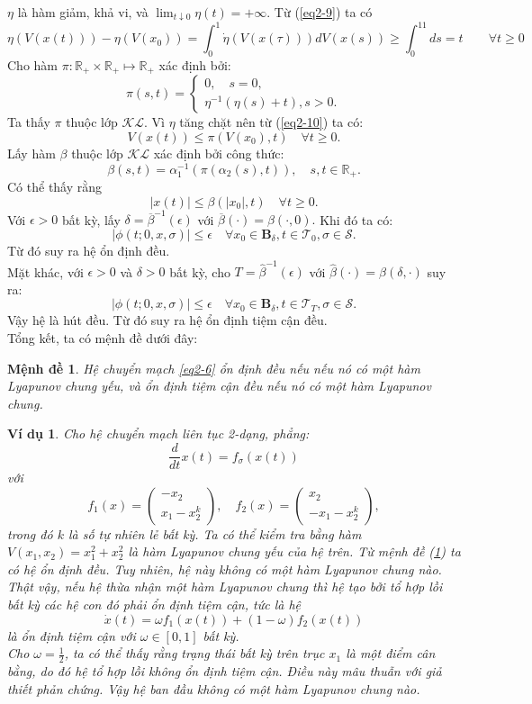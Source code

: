 \documentclass[14pt,a4paper,oneside]{report}		%
\newtheorem{proposition}[theorem]{Mệnh đề}
\newtheorem{example}[theorem]{Ví dụ}
\begin{document}
$\eta$ là hàm giảm, khả vi, và $\lim_{t\downarrow 0}\eta(t)=+\infty$. Từ (\ref{eq2-9}) ta có
\begin{equation} \label{eq2-10}
\eta (V(x(t))) - \eta (V(x_0)) = \int_0^1\dot{\eta}(V(x(\tau)))dV(x(s)) \geq \int_0^11ds=t\qquad\forall t\geq 0
\end{equation}
Cho hàm $\pi:\mathbb{R}_+\times\mathbb{R}_+\mapsto\mathbb{R}_+$ xác định bởi:
$$\pi(s,t)=
\begin{cases}
0, \quad s=0,\\
\eta^{-1}(\eta(s)+t), s>0.
\end{cases}$$
Ta thấy $\pi$ thuộc lớp $\mathcal{KL}$. Vì $\eta$ tăng chặt nên từ (\ref{eq2-10}) ta có:
$$V(x(t))\leq\pi(V(x_0),t)\quad\forall t\geq 0.$$
Lấy hàm $\beta$ thuộc lớp $\mathcal{KL}$ xác định bởi công thức:
$$\beta(s,t)=\alpha_1^{-1}(\pi(\alpha_2(s),t)), \quad s,t\in\mathbb{R}_+.$$
Có thể thấy rằng 
$$|x(t)|\leq\beta(|x_0|,t)\quad\forall t\geq 0.$$
Với $\epsilon>0$ bất kỳ, lấy $\delta=\overline{\beta}^{-1}(\epsilon)$ với $\overline{\beta}(\cdot)=\beta(\cdot,0).$ Khi đó ta có:
$$|\phi(t;0,x,\sigma)|\leq\epsilon\quad\forall x_0\in\mathbf{B}_\delta,t\in\mathcal{T}_0,\sigma\in\mathcal{S}.$$
Từ đó suy ra hệ ổn định đều.\\
Mặt khác, với $\epsilon >0$ và $\delta >0$ bất kỳ, cho $T=\widehat{\beta}^{-1}(\epsilon)$ với $\widehat{\beta}(\cdot)=\beta(\delta,\cdot)$ suy ra:
$$|\phi(t;0,x,\sigma)|\leq\epsilon\quad\forall x_0\in\mathbf{B}_\delta,t\in\mathcal{T}_T,\sigma\in\mathcal{S}.$$
Vậy hệ là hút đều. Từ đó suy ra hệ ổn định tiệm cận đều.\\
Tổng kết, ta có mệnh đề dưới đây:
\begin{proposition} \label{pro2-10}
Hệ chuyển mạch \ref{eq2-6} ổn định đều nếu nếu nó có một hàm Lyapunov chung yếu, và ổn định tiệm cận đều nếu nó có một hàm Lyapunov chung.
\end{proposition}

\begin{example}
Cho hệ chuyển mạch liên tục 2-dạng, phẳng:
$$\frac{d}{dt}x(t)=f_\sigma(x(t))$$
với
$$
f_1(x)=\begin{pmatrix}
-x_2 \\ x_1 - x_2^k
\end{pmatrix}, \quad f_2(x)=
\begin{pmatrix}
x_2 \\ -x_1-x_2^k
\end{pmatrix},$$
trong đó $k$ là số tự nhiên lẻ bất kỳ. Ta có thể kiểm tra bằng hàm $V(x_1,x_2)=x_1^2+x_2^2$ là hàm Lyapunov chung yếu của hệ trên. Từ mệnh đề (\ref{pro2-10}) ta có hệ ổn định đều. Tuy nhiên, hệ này không có một hàm Lyapunov chung nào. Thật vậy, nếu hệ thừa nhận một hàm Lyapunov chung thì hệ tạo bởi tổ hợp lồi bất kỳ các hệ con đó phải ổn định tiệm cận, tức là hệ
$$\dot{x}(t)=\omega f_1(x(t))+(1-\omega)f_2(x(t))$$
là ổn định tiệm cận với $\omega\in[0,1]$ bất kỳ.\\
Cho $\omega = \frac{1}{2}$, ta có thể thấy rằng trạng thái bất kỳ trên trục $x_1$ là một điểm cân bằng, do đó hệ tổ hợp lồi không ổn định tiệm cận. Điều này mâu thuẫn với giả thiết phản chứng. Vậy hệ ban đầu không có một hàm Lyapunov chung nào.
\end{example}
\end{document}

